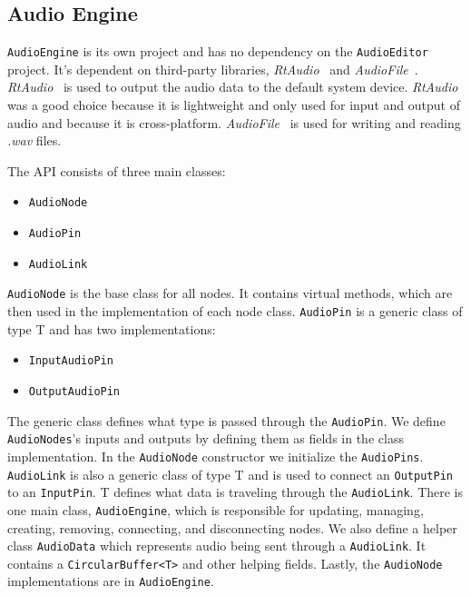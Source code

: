 \documentclass[conference]{IEEEtran}
\begin{document}
\subsection{Audio Engine}
\texttt{AudioEngine} is its own project and has no dependency on the \texttt{AudioEditor} project. It's dependent on third-party libraries, \textit{RtAudio}~\cite{rtaudio} and \textit{AudioFile}~\cite{audiofile}. \textit{RtAudio}~\cite{rtaudio} is used to output the audio data to the default system device. \textit{RtAudio} was a good choice because it is lightweight and only used for input and output of audio and because it is cross-platform. \textit{AudioFile}~\cite{audiofile} is used for writing and reading \textit{.wav} files.

The API consists of three main classes:
\begin{itemize}
    \item \texttt{AudioNode}
    \item \texttt{AudioPin}
    \item \texttt{AudioLink}
\end{itemize}

\texttt{AudioNode} is the base class for all nodes. It contains virtual methods, which are then used in the implementation of each node class. \texttt{AudioPin} is a generic class of type T and has two implementations:
\begin{itemize}
    \item \texttt{InputAudioPin}
    \item \texttt{OutputAudioPin}
\end{itemize}
The generic class defines what type is passed through the \texttt{AudioPin}. We define \texttt{AudioNodes}'s inputs and outputs by defining them as fields in the class implementation. In the \texttt{AudioNode} constructor we initialize the \texttt{AudioPins}. \texttt{AudioLink} is also a generic class of type T and is used to connect an \texttt{OutputPin} to an \texttt{InputPin}. T defines what data is traveling through the \texttt{AudioLink}. There is one main class, \texttt{AudioEngine}, which is responsible for updating, managing, creating, removing, connecting, and disconnecting nodes. We also define a helper class \texttt{AudioData} which represents audio being sent through a \texttt{AudioLink}. It contains a \texttt{CircularBuffer<T>} and other helping fields. Lastly, the \texttt{AudioNode} implementations are in \texttt{AudioEngine}.
\end{document}

